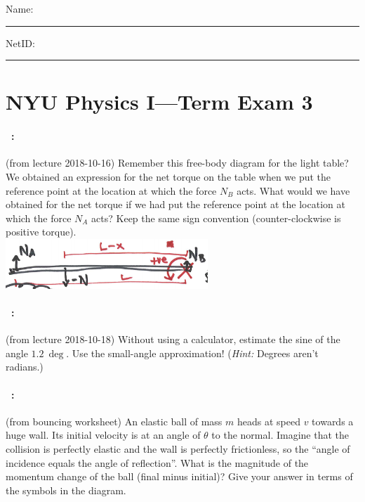 \documentclass[12pt]{article}
\begin{document}
\noindent
Name: \rule[-1ex]{0.55\textwidth}{0.1pt}
NetID: \rule[-1ex]{0.2\textwidth}{0.1pt}

\section*{NYU Physics I---Term Exam 3}

\paragraph{\problemname~\theproblem:}%
(from lecture 2018-10-16)
Remember this free-body diagram for the light table? We obtained an expression
for the net torque on the table when we put the reference point at the location
at which the force $N_B$ acts.
What would we have obtained for the net torque if we had put the reference point
at the location at which the force $N_A$ acts?
Keep the same sign convention (counter-clockwise is positive torque).\\
\includegraphics[width=3in]{../jpg/light_table.jpg}

\vfill

\paragraph{\problemname~\theproblem:}%
(from lecture 2018-10-18)
Without using a calculator, estimate the sine of the angle $1.2~\deg$.
Use the small-angle approximation! (\emph{Hint:} Degrees aren't radians.)

\vfill

\paragraph{\problemname~\theproblem:}%
(from bouncing worksheet)
An elastic ball of mass $m$ heads at speed $v$ towards a huge wall.
Its initial velocity is at an angle of $\theta$ to the normal.
Imagine that the collision is perfectly elastic and the
wall is perfectly frictionless, so the ``angle of incidence equals the
angle of reflection''. What is the magnitude of the momentum change of the ball (final
minus initial)?
Give your answer in terms of the symbols in the diagram.
\end{document}
